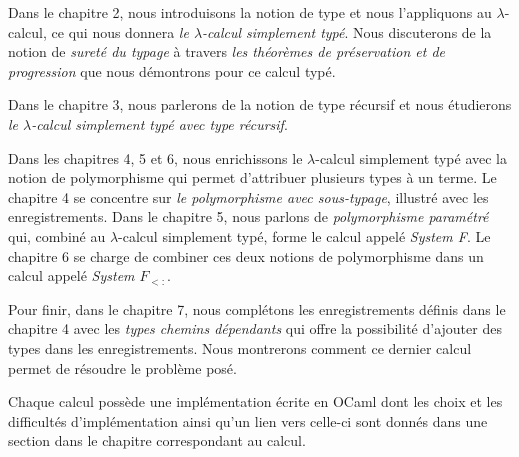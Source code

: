 Dans le chapitre 2, nous introduisons la notion de type et nous l'appliquons au
$\lambda$-calcul, ce qui nous donnera \textit{le $\lambda$-calcul simplement typé}. Nous
discuterons de la notion de \textit{sureté du typage} à travers \textit{les théorèmes
de préservation et de progression} que nous démontrons pour ce calcul typé.

Dans le chapitre 3, nous parlerons de la notion de type récursif et nous
étudierons \textit{le $\lambda$-calcul simplement typé avec type récursif}.

Dans les chapitres 4, 5 et 6, nous enrichissons le $\lambda$-calcul simplement
typé avec la notion de polymorphisme qui permet d'attribuer plusieurs types à un
terme. Le chapitre 4 se concentre sur \textit{le polymorphisme avec sous-typage},
illustré avec les enregistrements. Dans le chapitre 5, nous parlons de
\textit{polymorphisme paramétré} qui, combiné au $\lambda$-calcul simplement typé, forme
le calcul appelé \textit{System F}.
Le chapitre 6 se charge de combiner ces deux notions de polymorphisme dans un
calcul appelé \textit{System $F_{<:}$}.

Pour finir, dans le chapitre 7, nous complétons les enregistrements définis
dans le chapitre 4 avec les \textit{types chemins dépendants} qui offre la possibilité
d'ajouter des types dans les enregistrements. Nous montrerons comment ce dernier
calcul permet de résoudre le problème posé.

Chaque calcul possède une implémentation écrite en OCaml dont les choix et les
difficultés d'implémentation ainsi qu'un lien vers celle-ci sont donnés dans une
section dans le chapitre correspondant au calcul.


